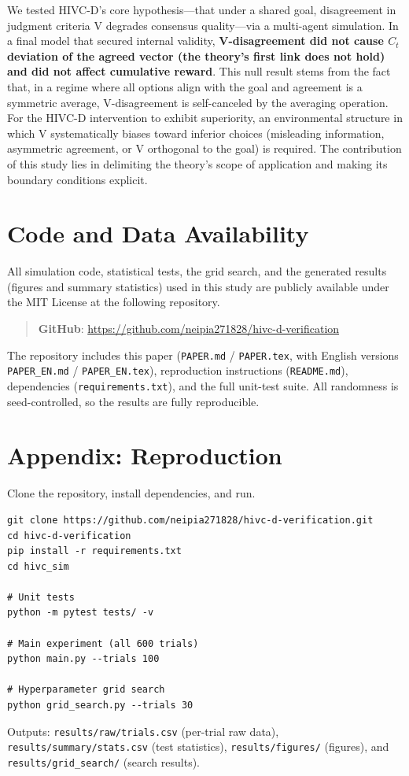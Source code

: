 \documentclass[11pt]{article}
\newcommand{\Ct}{\ensuremath{C_t}}
\begin{document}
We tested HIVC-D's core hypothesis---that under a shared goal, disagreement in judgment criteria V degrades consensus quality---via a multi-agent simulation. In a final model that secured internal validity, \textbf{V-disagreement did not cause \Ct{} deviation of the agreed vector (the theory's first link does not hold) and did not affect cumulative reward}. This null result stems from the fact that, in a regime where all options align with the goal and agreement is a symmetric average, V-disagreement is self-canceled by the averaging operation. For the HIVC-D intervention to exhibit superiority, an environmental structure in which V systematically biases toward inferior choices (misleading information, asymmetric agreement, or V orthogonal to the goal) is required. The contribution of this study lies in delimiting the theory's scope of application and making its boundary conditions explicit.

\section*{Code and Data Availability}

All simulation code, statistical tests, the grid search, and the generated results (figures and summary statistics) used in this study are publicly available under the MIT License at the following repository.

\begin{quote}
\textbf{GitHub}: \url{https://github.com/neipia271828/hivc-d-verification}
\end{quote}

The repository includes this paper (\texttt{PAPER.md} / \texttt{PAPER.tex}, with English versions \texttt{PAPER\_EN.md} / \texttt{PAPER\_EN.tex}), reproduction instructions (\texttt{README.md}), dependencies (\texttt{requirements.txt}), and the full unit-test suite. All randomness is seed-controlled, so the results are fully reproducible.

\section*{Appendix: Reproduction}

Clone the repository, install dependencies, and run.

\begin{Verbatim}[frame=single,fontsize=\small]
git clone https://github.com/neipia271828/hivc-d-verification.git
cd hivc-d-verification
pip install -r requirements.txt
cd hivc_sim

# Unit tests
python -m pytest tests/ -v

# Main experiment (all 600 trials)
python main.py --trials 100

# Hyperparameter grid search
python grid_search.py --trials 30
\end{Verbatim}

Outputs: \texttt{results/raw/trials.csv} (per-trial raw data), \texttt{results/summary/stats.csv} (test statistics), \texttt{results/figures/} (figures), and \texttt{results/grid\_search/} (search results).
\end{document}
